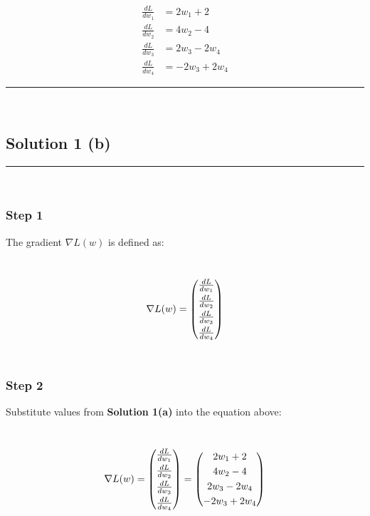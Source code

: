 \documentclass{article}
\begin{document}
\begin{align*}
  \frac{dL}{dw_1} &= 2w_1 + 2 \\
  \frac{dL}{dw_2} &= 4w_2 - 4 \\
  \frac{dL}{dw_3} &= 2w_3 - 2w_4 \\
  \frac{dL}{dw_4} &= -2w_3 + 2w_4
\end{align*}

\noindent\rule{\textwidth}{0.4pt}\\

\newpage

\subsection*{Solution 1 (b)}
\noindent\rule{\textwidth}{0.4pt}\\

\subsubsection*{Step 1}
\parbox{\textwidth}{
The gradient $\nabla L(w)$ is defined as:
}\\

$$\nabla L(w) = \begin{pmatrix} 
\frac{dL}{dw_1} \vspace{0.1cm}\\
\frac{dL}{dw_2} \vspace{0.1cm}\\
\frac{dL}{dw_3} \vspace{0.1cm}\\
\frac{dL}{dw_4}
\end{pmatrix}$$\\

\subsubsection*{Step 2}
\parbox{\textwidth}{
Substitute values from \textbf{Solution 1(a)} into the equation above:
}\\

$$\nabla L(w) = \begin{pmatrix} 
\frac{dL}{dw_1} \vspace{0.1cm}\\
\frac{dL}{dw_2} \vspace{0.1cm}\\
\frac{dL}{dw_3} \vspace{0.1cm}\\
\frac{dL}{dw_4}
\end{pmatrix} = \begin{pmatrix} 
2w_1 + 2 \vspace{0.1cm}\\
4w_2 - 4 \vspace{0.1cm}\\
2w_3 - 2w_4 \vspace{0.1cm}\\
-2w_3 + 2w_4
\end{pmatrix}$$\\
\end{document}
